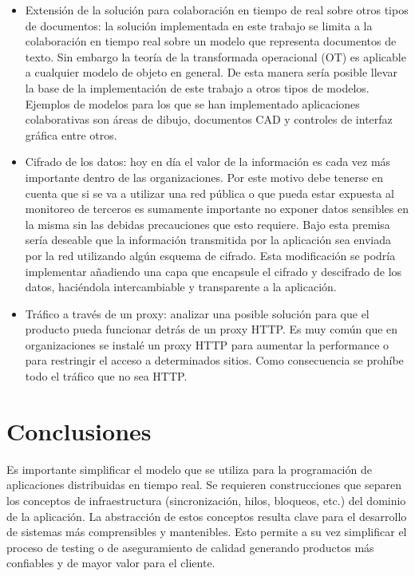 \documentclass[12pt,a4paper]{article}
\let\stdsection\section
\renewcommand\section{\newpage\stdsection}
\begin{document}
\begin{itemize}
	\item Extensión de la solución para colaboración en tiempo de real sobre otros tipos de documentos:
		la solución implementada en este trabajo se limita a la colaboración en tiempo real sobre un modelo que representa
		documentos de texto. Sin embargo la teoría de la transformada operacional (OT) es aplicable a cualquier modelo de objeto en
		general. De esta manera sería posible llevar la base de la implementación de este trabajo a otros tipos de modelos. Ejemplos
		de modelos para los que se han implementado aplicaciones colaborativas son áreas de dibujo, documentos CAD y controles de
		interfaz gráfica entre otros.

	\item Cifrado de los datos: hoy en día el valor de la información es cada vez más importante dentro de las organizaciones. 
		Por este motivo debe tenerse en cuenta que si se va a utilizar una red pública o que pueda estar expuesta al monitoreo
		de terceros es sumamente importante no exponer datos sensibles en la misma sin las debidas precauciones que esto requiere.
		Bajo esta premisa sería deseable que la información transmitida por la aplicación sea enviada por la red utilizando algún
		esquema de cifrado. Esta modificación se podría implementar añadiendo una capa que encapsule el cifrado y descifrado de
		los datos, haciéndola intercambiable y transparente a la aplicación.

	\item Tráfico a través de un proxy: analizar una posible solución para que el producto pueda funcionar detrás de un
		proxy HTTP. Es muy común que en organizaciones se instalé un proxy HTTP para aumentar la performance o para
		restringir el acceso a determinados sitios. Como consecuencia se prohíbe todo el tráfico que no sea HTTP.
		
\end{itemize}

\section{Conclusiones}

Es importante simplificar el modelo que se utiliza para la programación de aplicaciones distribuidas
en tiempo real. Se requieren construcciones que separen los conceptos de infraestructura (sincronización, hilos, bloqueos, etc.)
del dominio de la aplicación. La abstracción de estos conceptos resulta clave para el desarrollo de sistemas
más comprensibles y mantenibles. Esto permite a su vez simplificar el proceso de testing o de aseguramiento
de calidad generando productos más confiables y de mayor valor para el cliente.
\end{document}
